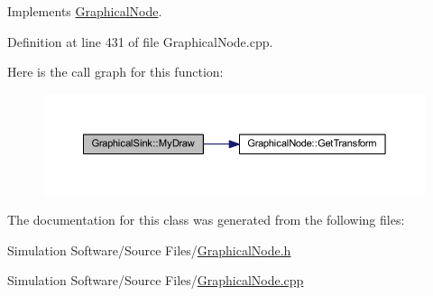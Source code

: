 Implements \hyperlink{class_graphical_node_a4a5d4f48454a9721a940499d4f59b0ce}{Graphical\+Node}.



Definition at line 431 of file Graphical\+Node.\+cpp.

Here is the call graph for this function\+:\nopagebreak
\begin{figure}[H]
\begin{center}
\leavevmode
\includegraphics[width=350pt]{class_graphical_sink_abac58f5bfe23ab2a799560171c036507_cgraph}
\end{center}
\end{figure}


The documentation for this class was generated from the following files\+:\begin{DoxyCompactItemize}
\item 
Simulation Software/\+Source Files/\hyperlink{_graphical_node_8h}{Graphical\+Node.\+h}\item 
Simulation Software/\+Source Files/\hyperlink{_graphical_node_8cpp}{Graphical\+Node.\+cpp}\end{DoxyCompactItemize}
